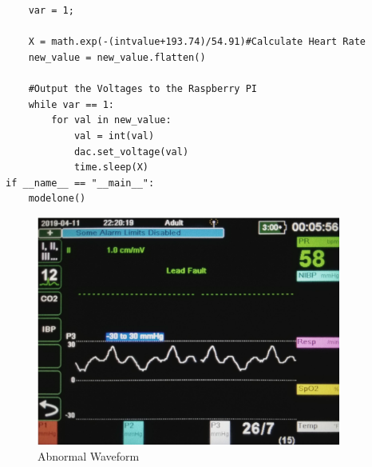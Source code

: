 \documentclass[12pt]{report}
\begin{document}
\begin{lstlisting}
    
    
    var = 1;
    
    X = math.exp(-(intvalue+193.74)/54.91)#Calculate Heart Rate
    new_value = new_value.flatten()

    #Output the Voltages to the Raspberry PI
    while var == 1:
        for val in new_value:
            val = int(val)
            dac.set_voltage(val)
            time.sleep(X)
if __name__ == "__main__":
    modelone()
\end{lstlisting}
\begin{figure}[h!]
\includegraphics[width = 10cm]{Abnormal.png}
\centering
\caption{Abnormal Waveform}
\end{figure}
\newpage
\end{document}
